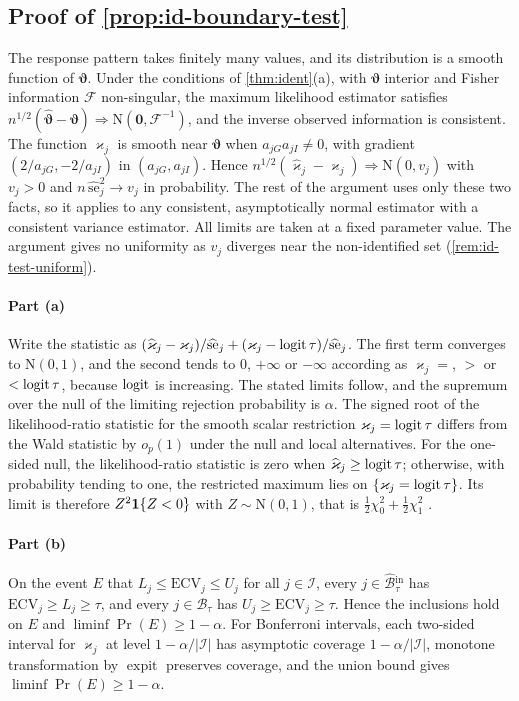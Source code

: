 \subsection{Proof of \texorpdfstring{\cref{prop:id-boundary-test}}{the boundary-test proposition}}\label{app:pm-test}

The response pattern takes finitely many values, and its distribution is a smooth function of $\bm\vartheta$. Under the conditions of \cref{thm:ident}(a), with $\bm\vartheta$ interior and Fisher information $\bm{\mathcal F}$ non-singular, the maximum likelihood estimator satisfies $n^{1/2}(\widehat{\bm\vartheta}-\bm\vartheta)\Rightarrow\mathrm N(\bm0,\bm{\mathcal F}^{-1})$, and the inverse observed information is consistent. The function $\varkappa_j$ is smooth near $\bm\vartheta$ when $a_{jG}a_{jI}\neq0$, with gradient $(2/a_{jG},-2/a_{jI})$ in $(a_{jG},a_{jI})$. Hence $n^{1/2}(\widehat\varkappa_j-\varkappa_j)\Rightarrow\mathrm N(0,v_j)$ with $v_j>0$ and $n\,\widehat{\mathrm{se}}_j^2\to v_j$ in probability. The rest of the argument uses only these two facts, so it applies to any consistent, asymptotically normal estimator with a consistent variance estimator. All limits are taken at a fixed parameter value. The argument gives no uniformity as $v_j$ diverges near the non-identified set (\cref{rem:id-test-uniform}).

\paragraph{Part (a)}
Write the statistic as $(\widehat\varkappa_j-\varkappa_j)/\widehat{\mathrm{se}}_j+(\varkappa_j-\operatorname{logit}\tau)/\widehat{\mathrm{se}}_j$. The first term converges to $\mathrm N(0,1)$, and the second tends to $0$, $+\infty$ or $-\infty$ according as $\varkappa_j=$, $>$ or $<\operatorname{logit}\tau$, because $\operatorname{logit}$ is increasing. The stated limits follow, and the supremum over the null of the limiting rejection probability is $\alpha$. The signed root of the likelihood-ratio statistic for the smooth scalar restriction $\varkappa_j=\operatorname{logit}\tau$ differs from the Wald statistic by $o_p(1)$ under the null and local alternatives. For the one-sided null, the likelihood-ratio statistic is zero when $\widehat\varkappa_j\ge\operatorname{logit}\tau$; otherwise, with probability tending to one, the restricted maximum lies on $\{\varkappa_j=\operatorname{logit}\tau\}$. Its limit is therefore $Z^2\mathbf{1}\!\left\{Z<0\right\}$ with $Z\sim\mathrm N(0,1)$, that is $\tfrac12\chi^2_0+\tfrac12\chi^2_1$ \citep{chernoff1954,self1987}.

\paragraph{Part (b)}
On the event $E$ that $L_j\le\mathrm{ECV}_j\le U_j$ for all $j\in\mathcal I$, every $j\in\widehat{\mathcal B}{}^{\mathrm{in}}_\tau$ has $\mathrm{ECV}_j\ge L_j\ge\tau$, and every $j\in\mathcal B_\tau$ has $U_j\ge\mathrm{ECV}_j\ge\tau$. Hence the inclusions hold on $E$ and $\liminf\Pr(E)\ge1-\alpha$. For Bonferroni intervals, each two-sided interval for $\varkappa_j$ at level $1-\alpha/|\mathcal I|$ has asymptotic coverage $1-\alpha/|\mathcal I|$, monotone transformation by $\operatorname{expit}$ preserves coverage, and the union bound gives $\liminf\Pr(E)\ge1-\alpha$.

